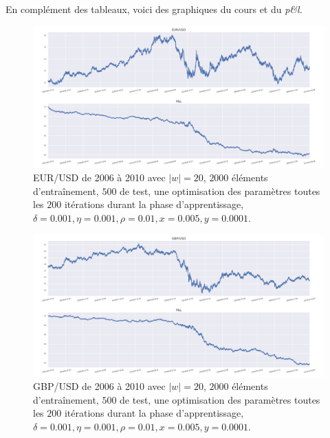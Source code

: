 \documentclass[a4paper, 11pt]{article}
\begin{document}
En complément des tableaux, voici des graphiques du cours et du \textit{p\&l}.
\begin{figure}
	\centering
	\includegraphics[scale=0.5]{res/eursud_2006-2010}
	\caption{EUR/USD de 2006 à 2010 avec $|w| = 20$, $2000$ éléments d'entraînement, $500$ de test, une optimisation des
		paramètres toutes les $200$ itérations durant la phase d'apprentissage, $\delta = 0.001, \eta=0.001,\rho=0.01, x = 0.005, y=0.0001$.}
\end{figure}

\begin{figure}
	\centering
	\includegraphics[scale=0.5]{res/gbpusd_2006-2010}
	\caption{GBP/USD de 2006 à 2010 avec $|w| = 20$, $2000$ éléments d'entraînement, $500$ de test, une optimisation des
		paramètres toutes les $200$ itérations durant la phase d'apprentissage, $\delta = 0.001, \eta=0.001,\rho=0.01, x = 0.005, y=0.0001$.}
\end{figure}
\end{document}
